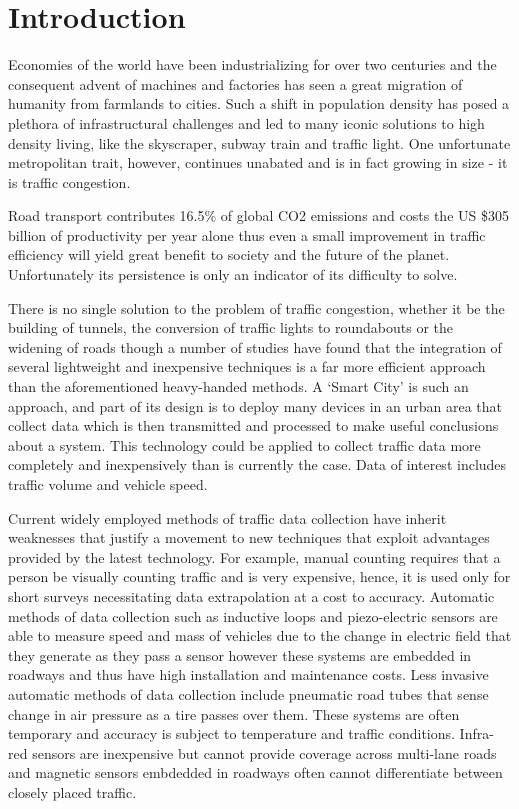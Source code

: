 \chapter{Introduction}
\parskip 0.2in
Economies of the world have been industrializing for over two centuries \cite{industrialization} and the consequent advent of machines and factories has seen a great migration of humanity from farmlands to cities. Such a shift in population density has posed a plethora of infrastructural challenges and led to many iconic solutions to high density living, like the skyscraper, subway train and traffic light. One unfortunate metropolitan trait, however, continues unabated and is in fact growing in size \cite{trafficworse} - it is traffic congestion.

Road transport contributes 16.5\% of global CO2 emissions \cite{emissions} and costs the US \$305 billion of productivity per year alone \cite{ecotoll}\cite{cost} thus even a small improvement in traffic efficiency will yield great benefit to society and the future of the planet. Unfortunately its persistence is only an indicator of its difficulty to solve.

There is no single solution to the problem of traffic congestion, whether it be the building of tunnels, the conversion of traffic lights to roundabouts or the widening of roads though a number of studies \cite{mixedSolution}\cite{smartsolution}\cite{smartsolution2}\cite{smartsolution3} have found that the integration of several lightweight and inexpensive techniques is a far more efficient approach than the aforementioned heavy-handed methods. A ‘Smart City’ is such an approach, and part of its design is to deploy many devices in an urban area that collect data \cite{iot} which is then transmitted and processed to make useful conclusions about a system. This technology could be applied to collect traffic data more completely and inexpensively than is currently the case. Data of interest includes traffic volume and vehicle speed.
 
Current widely employed methods of traffic data collection \cite{methodsofcollection} have inherit weaknesses that justify a movement to new techniques that exploit advantages provided by the latest technology. For example, manual counting requires that a person be visually counting traffic and is very expensive, hence, it is used only  for short surveys necessitating data extrapolation at a cost to accuracy. Automatic methods of data collection such as inductive loops and piezo-electric sensors are able to measure speed and mass of vehicles due to the change in electric field that they generate as they pass a sensor however these systems are embedded in roadways and thus have high installation and maintenance costs. Less invasive automatic methods of data collection include pneumatic road tubes that sense change in air pressure as a tire passes over them. These systems are often temporary and accuracy is subject to temperature and traffic conditions. Infra-red sensors are inexpensive but cannot provide coverage across multi-lane roads and magnetic sensors embdedded in roadways often cannot differentiate between closely placed traffic. 

